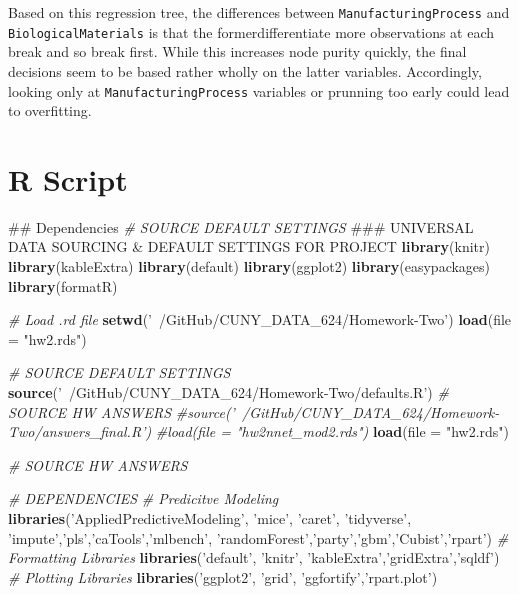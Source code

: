 \documentclass[]{report}
\newenvironment{Shaded}{\begin{snugshade}}{\end{snugshade}}
\newcommand{\KeywordTok}[1]{\textcolor[rgb]{0.13,0.29,0.53}{\textbf{#1}}}
\newcommand{\DataTypeTok}[1]{\textcolor[rgb]{0.13,0.29,0.53}{#1}}
\newcommand{\StringTok}[1]{\textcolor[rgb]{0.31,0.60,0.02}{#1}}
\newcommand{\CommentTok}[1]{\textcolor[rgb]{0.56,0.35,0.01}{\textit{#1}}}
\newcommand{\NormalTok}[1]{#1}
\begin{document}
Based on this regression tree, the differences between
\texttt{ManufacturingProcess} and \texttt{BiologicalMaterials} is that
the formerdifferentiate more observations at each break and so break
first. While this increases node purity quickly, the final decisions
seem to be based rather wholly on the latter variables. Accordingly,
looking only at \texttt{ManufacturingProcess} variables or prunning too
early could lead to overfitting.

\chapter*{R Script}\label{R-Script}

\begin{Shaded}
\begin{Highlighting}[]
\NormalTok{## Dependencies}
\CommentTok{# SOURCE DEFAULT SETTINGS}
\NormalTok{### UNIVERSAL DATA SOURCING & DEFAULT SETTINGS FOR PROJECT}
\KeywordTok{library}\NormalTok{(knitr)}
\KeywordTok{library}\NormalTok{(kableExtra)}
\KeywordTok{library}\NormalTok{(default)}
\KeywordTok{library}\NormalTok{(ggplot2)}
\KeywordTok{library}\NormalTok{(easypackages)}
\KeywordTok{library}\NormalTok{(formatR)}

\CommentTok{# Load .rd file}
\KeywordTok{setwd}\NormalTok{(}\StringTok{'~/GitHub/CUNY_DATA_624/Homework-Two'}\NormalTok{)}
\KeywordTok{load}\NormalTok{(}\DataTypeTok{file =} \StringTok{"hw2.rds"}\NormalTok{)}

\CommentTok{# SOURCE DEFAULT SETTINGS}
\KeywordTok{source}\NormalTok{(}\StringTok{'~/GitHub/CUNY_DATA_624/Homework-Two/defaults.R'}\NormalTok{)}
\CommentTok{# SOURCE HW ANSWERS}
\CommentTok{#source('~/GitHub/CUNY_DATA_624/Homework-Two/answers_final.R')}
\CommentTok{#load(file = "hw2nnet_mod2.rds")}
\KeywordTok{load}\NormalTok{(}\DataTypeTok{file =} \StringTok{"hw2.rds"}\NormalTok{)}

\CommentTok{# SOURCE HW ANSWERS}

\CommentTok{# DEPENDENCIES}
\CommentTok{# Predicitve Modeling}
\KeywordTok{libraries}\NormalTok{(}\StringTok{'AppliedPredictiveModeling'}\NormalTok{, }
          \StringTok{'mice'}\NormalTok{,}
          \StringTok{'caret'}\NormalTok{, }
          \StringTok{'tidyverse'}\NormalTok{,}
          \StringTok{'impute'}\NormalTok{,}\StringTok{'pls'}\NormalTok{,}\StringTok{'caTools'}\NormalTok{,}\StringTok{'mlbench'}\NormalTok{,}
          \StringTok{'randomForest'}\NormalTok{,}\StringTok{'party'}\NormalTok{,}\StringTok{'gbm'}\NormalTok{,}\StringTok{'Cubist'}\NormalTok{,}\StringTok{'rpart'}\NormalTok{)}
\CommentTok{# Formatting Libraries}
\KeywordTok{libraries}\NormalTok{(}\StringTok{'default'}\NormalTok{, }\StringTok{'knitr'}\NormalTok{, }
          \StringTok{'kableExtra'}\NormalTok{,}\StringTok{'gridExtra'}\NormalTok{,}\StringTok{'sqldf'}\NormalTok{)}
\CommentTok{# Plotting Libraries}
\KeywordTok{libraries}\NormalTok{(}\StringTok{'ggplot2'}\NormalTok{, }\StringTok{'grid'}\NormalTok{, }
          \StringTok{'ggfortify'}\NormalTok{,}\StringTok{'rpart.plot'}\NormalTok{)}



\end{Highlighting}
\end{Shaded}
\end{document}
